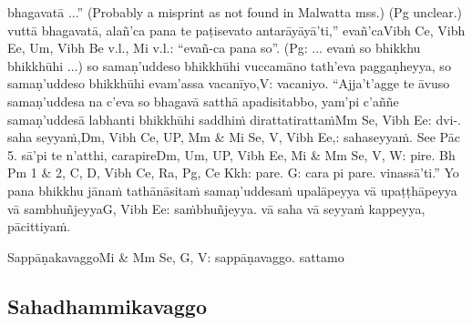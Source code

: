 bhagavatā ...” (Probably a misprint as not found in Malwatta mss.) (Pg unclear.) vuttā bhagavatā, alañ'ca pana te paṭisevato antarāyāyā'ti,'' evañ'ca\makeatletter\hyperlink{endnote-appendix}\makeatother Vibh Ce, Vibh Ee, Um, Vibh Be v.l., Mi v.l.: “evañ-ca pana so”. (Pg: ... evaṁ so bhikkhu bhikkhūhi ...) so samaṇ'uddeso bhikkhūhi vuccamāno tath'eva paggaṇheyya, so samaṇ'uddeso bhikkhūhi evam'assa vacanīyo,\makeatletter\hyperlink{endnote-appendix}\makeatother V: vacaniyo. ``Ajja't'agge te āvuso samaṇ'uddesa na c'eva so bhagavā satthā apadisitabbo, yam'pi c'aññe samaṇ'uddesā labhanti bhikkhūhi saddhiṁ dirattatirattaṁ\makeatletter\hyperlink{endnote-appendix}\makeatother Mm Se, Vibh Ee: dvi-. saha seyyaṁ,\makeatletter\hyperlink{endnote-appendix}\makeatother Dm, Vibh Ce, UP, Mm & Mi Se, V, Vibh Ee,: sahaseyyaṁ. See Pāc 5. sā'pi te n'atthi, carapire\makeatletter\hyperlink{endnote-appendix}\makeatother Dm, Um, UP, Vibh Ee, Mi & Mm Se, V, W: pire. Bh Pm 1 & 2, C, D, Vibh Ce, Ra, Pg, Ce Kkh: pare. G: cara pi pare. vinassā'ti.'' Yo pana bhikkhu jānaṁ tathānāsitaṁ samaṇ'uddesaṁ upalāpeyya vā upaṭṭhāpeyya vā sambhuñjeyya\makeatletter\hyperlink{endnote-appendix}\makeatother G, Vibh Ee: saṁbhuñjeyya. vā saha vā seyyaṁ kappeyya, pācittiyaṁ.

\begin{center}
	Sappāṇakavaggo\makeatletter\hyperlink{endnote-appendix}\makeatother Mi & Mm Se, G, V: sappāṇavaggo. sattamo
\end{center}



\subsection{Sahadhammikavaggo}


